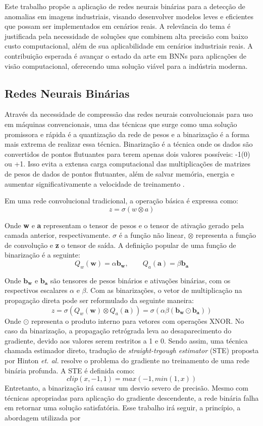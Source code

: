 \documentclass[12pt]{article}
\begin{document}
Este trabalho propõe a aplicação de redes neurais binárias para a detecção de anomalias em imagens industriais, visando desenvolver modelos leves e eficientes que possam ser implementados em cenários reais. A relevância do tema é justificada pela necessidade de soluções que combinem alta precisão com baixo custo computacional, além de sua aplicabilidade em cenários industriais reais. A contribuição esperada é avançar o estado da arte em BNNs para aplicações de visão computacional, oferecendo uma solução viável para a indústria moderna.

\subsection{Redes Neurais Binárias}
Através da necessidade de compressão das redes neurais convolucionais para uso em máquinas convencionais, uma das técnicas que surge como uma solução promissora e rápida é a quantização da rede de pesos e a binarização é a forma mais extrema de realizar essa técnica. Binarização é a técnica onde os dados são convertidos de pontos flutuantes para terem apenas dois valores possíveis: -1(0) ou +1. Isso evita a extensa carga computacional das multiplicações de matrizes de pesos de dados de pontos flutuantes, além de salvar memória, energia e aumentar significativamente a velocidade de treinamento \cite{bulat2020binary}.

Em uma rede convolucional tradicional, a operação básica é expressa como:
\[z = \sigma (w \otimes a)\]

Onde \textbf{w} e \textbf{a} representam o tensor de pesos e o tensor de ativação gerado pela camada anterior, respectivamente. \textbf{$\sigma$} é a função não linear, \textbf{$\otimes$} representa a função de convolução e \textbf{z} o tensor de saída.
A definição popular de uma função de binarização é a seguinte:
\[Q_w(\bm{w}) = \alpha \bm{b_w},\qquad Q_a (\bm{a}) = \beta \bm{b_a}\]

Onde $\bm{b_w}$ e $\bm{b_a}$ são tensores de pesos binários e ativações binárias, com os respectivos escalares $\alpha$ e $\beta$. 
Com as binarizações, o vetor de multiplicação na propagação direta pode ser reformulado da seguinte maneira:
\[ z = \sigma (Q_w(\bm{w}) \otimes Q_a (\bm{a}))= \sigma(\alpha \beta(\bm{b_w} \odot \bm{b_a}))\]
Onde $\odot$ representa o produto interno para vetores com operações XNOR.
No caso da binarização, a propagação retrógrada leva ao desaparecimento do gradiente, devido aos valores serem restritos a 1 e 0. Sendo assim, uma técnica chamada estimador direto, tradução de \textit{straight-trgough estimator} (STE) proposta por Hinton \textit{et. al.} resolve o problema do gradiente no treinamento de uma rede binária profunda. A STE é definida como:
\[ clip(x, -1, 1) = max(-1, min(1, x))\]
Entretanto, a binarização irá causar um desvio severo de precisão. Mesmo com técnicas apropriadas para aplicação do gradiente descendente, a rede binária falha em retornar uma solução satisfatória.
Esse trabalho irá seguir, a princípio, a abordagem utilizada por \cite{McDonnell2018}
\end{document}
